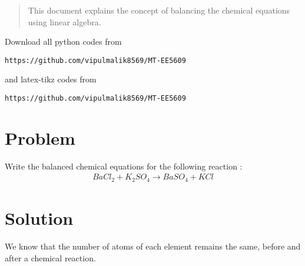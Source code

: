 \documentclass[journal,12pt,twocolumn]{IEEEtran}
\begin{document}
\date{\today}

\maketitle
\newpage
\bigskip
\renewcommand{\thefigure}{\theenumi}
\renewcommand{\thetable}{\theenumi}

\begin{abstract}
This document explains the concept of balancing the chemical equations using linear algebra.
\end{abstract}
Download all python codes from 
\begin{lstlisting}
https://github.com/vipulmalik8569/MT-EE5609
\end{lstlisting}
and latex-tikz codes from 
\begin{lstlisting}
https://github.com/vipulmalik8569/MT-EE5609
\end{lstlisting}
\section{\textbf{Problem}}
Write the balanced chemical equations for the following reaction :
\begin{align}
 BaCl_2 + K_2SO_4 \rightarrow BaSO_4 + KCl \label{eq:1}   
\end{align}
\section{\textbf{Solution}}
We know that the number of atoms of each element remains the
same, before and after a chemical reaction.
\end{document}
